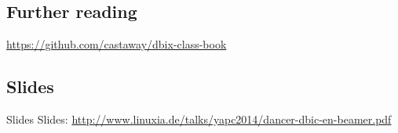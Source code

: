 
\subsection{Further reading}

\url{https://github.com/castaway/dbix-class-book}

\subsection{Slides}

\begin{frame}{Slides}
Slides:
\url{http://www.linuxia.de/talks/yapc2014/dancer-dbic-en-beamer.pdf}
\end{frame}



